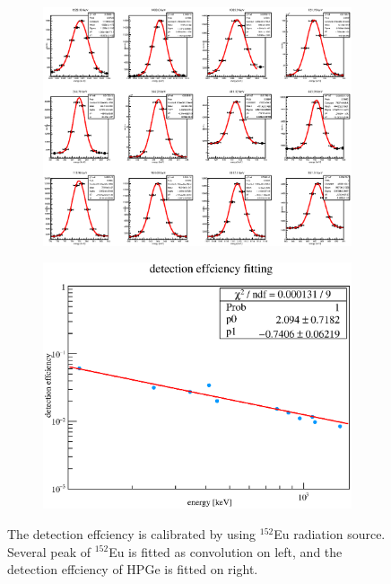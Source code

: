   \begin{figure}[H]
   \begin{subfigure}{0.3\textwidth}
    \centering
	\includegraphics[scale=0.46]{chapter4/fig/Eufit.eps}
   \end{subfigure}
   \hspace{0.25\textwidth}
   \begin{subfigure}{0.3\textwidth}
    \centering
	\includegraphics[scale=0.35]{chapter4/fig/detectioneff.eps}
   \end{subfigure}
   \caption{The detection effciency is calibrated by using $^{152}$Eu radiation source. Several peak of $^{152}$Eu is fitted as convolution on left, and the detection effciency of HPGe is fitted on right.}
   \label{3source}
  \end{figure}
